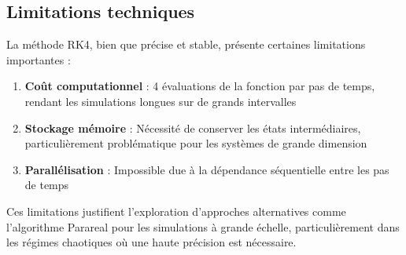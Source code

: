 \subsection{Limitations techniques}
La méthode RK4, bien que précise et stable, présente certaines limitations importantes :

\begin{enumerate}
    \item \textbf{Coût computationnel} : 4 évaluations de la fonction par pas de temps, rendant les simulations longues sur de grands intervalles
    \item \textbf{Stockage mémoire} : Nécessité de conserver les états intermédiaires, particulièrement problématique pour les systèmes de grande dimension
    \item \textbf{Parallélisation} : Impossible due à la dépendance séquentielle entre les pas de temps
\end{enumerate}

Ces limitations justifient l'exploration d'approches alternatives comme l'algorithme Parareal pour les simulations à grande échelle, particulièrement dans les régimes chaotiques où une haute précision est nécessaire.